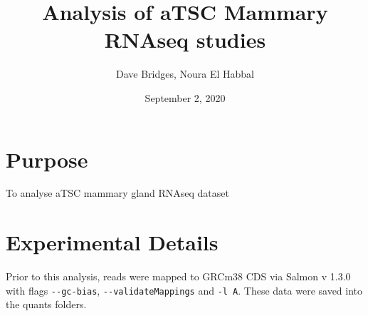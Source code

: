 \documentclass[]{article}
\title{Analysis of aTSC Mammary RNAseq studies}
\author{Dave Bridges, Noura El Habbal}
\date{September 2, 2020}
\begin{document}
\maketitle

{
\setcounter{tocdepth}{2}
\tableofcontents
}
\hypertarget{purpose}{%
\section{Purpose}\label{purpose}}

To analyse aTSC mammary gland RNAseq dataset

\hypertarget{experimental-details}{%
\section{Experimental Details}\label{experimental-details}}

Prior to this analysis, reads were mapped to GRCm38 CDS via Salmon v
1.3.0 with flags \texttt{-\/-gc-bias}, \texttt{-\/-validateMappings} and
\texttt{-l\ A}. These data were saved into the quants folders.
\end{document}
